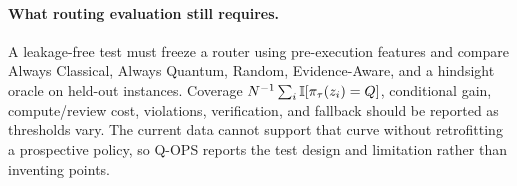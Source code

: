 \paragraph{What routing evaluation still requires.}
A leakage-free test must freeze a router using pre-execution features and compare Always Classical, Always Quantum, Random, Evidence-Aware, and a hindsight oracle on held-out instances. Coverage $N^{-1}\sum_i\mathbb{I}[\pi_\tau(z_i)=Q]$, conditional gain, compute/review cost, violations, verification, and fallback should be reported as thresholds vary. The current data cannot support that curve without retrofitting a prospective policy, so Q-OPS reports the test design and limitation rather than inventing points.
